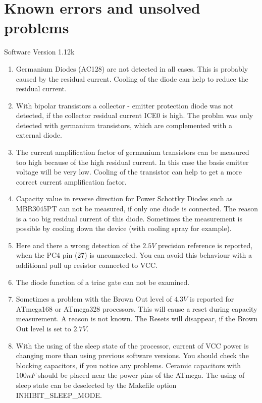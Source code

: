 
\chapter{Known errors and unsolved problems}
{\center Software Version 1.12k}

\begin{enumerate} \setlength{\itemsep}{0em}

\item Germanium Diodes (AC128) are not detected in all cases. This is probably caused by the residual current.
Cooling of the diode can help to reduce the residual current.

\item With bipolar transistors a collector - emitter protection diode was not detected, if the
collector residual current ICE0 is high. 
The problm was only detected with germanium transistors, which are complemented with a external diode.

\item The current amplification factor of germanium transistors can be measured too high because of
the high residual current. In this case the basis emitter voltage will be very low.
Cooling of the transistor can help to get a more correct current amplification factor.

\item Capacity value in reverse direction for Power Schottky Diodes such as MBR3045PT can not be measured,
if only one diode is connected. The reason is a too big residual current of this diode.
Sometimes the measurement is possible by cooling down the device (with  cooling spray for example).

\item Here and there  a wrong detection of the \(2.5V\) precision reference is reported, when the PC4 pin (27) is unconnected.
You can avoid this behaviour with a additional pull up resistor connected to VCC.

\item The diode function of a triac gate can not be examined.

\item Sometimes a problem with the Brown Out level of \(4.3V\) is reported for ATmega168 or ATmega328 processors.
This will cause a reset during capacity measurement. A reason is not known.
The Resets will disappear, if the Brown Out level is set to \(2.7V\).

\item With the using of the sleep state of the processor, current of VCC power is changing more than 
using previous software versions.
You should check the blocking capacitors, if you notice any problems.
Ceramic capacitors with \(100nF\) should be placed near the power pins of the ATmega. 
The using of sleep state can be deselected by the Makefile option INHIBIT\_SLEEP\_MODE.


\end{enumerate}
